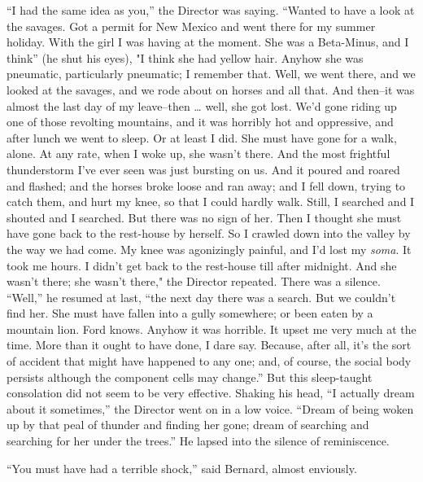 \documentclass[12pt]{report}
\begin{document}
``I had the same idea as you,'' the Director was saying. ``Wanted to
have a look at the savages. Got a permit for New Mexico and went there
for my summer holiday. With the girl I was having at the moment. She was
a Beta-Minus, and I think'' (he shut his eyes), "I think she had yellow
hair. Anyhow she was pneumatic, particularly pneumatic; I remember that.
Well, we went there, and we looked at the savages, and we rode about on
horses and all that. And then--it was almost the last day of my
leave--then \ldots{} well, she got lost. We'd gone riding up one of
those revolting mountains, and it was horribly hot and oppressive, and
after lunch we went to sleep. Or at least I did. She must have gone for
a walk, alone. At any rate, when I woke up, she wasn't there. And the
most frightful thunderstorm I've ever seen was just bursting on us. And
it poured and roared and flashed; and the horses broke loose and ran
away; and I fell down, trying to catch them, and hurt my knee, so that I
could hardly walk. Still, I searched and I shouted and I searched. But
there was no sign of her. Then I thought she must have gone back to the
rest-house by herself. So I crawled down into the valley by the way we
had come. My knee was agonizingly painful, and I'd lost my \emph{soma}.
It took me hours. I didn't get back to the rest-house till after
midnight. And she wasn't there; she wasn't there," the Director
repeated. There was a silence. ``Well,'' he resumed at last, ``the next
day there was a search. But we couldn't find her. She must have fallen
into a gully somewhere; or been eaten by a mountain lion. Ford knows.
Anyhow it was horrible. It upset me very much at the time. More than it
ought to have done, I dare say. Because, after all, it's the sort of
accident that might have happened to any one; and, of course, the social
body persists although the component cells may change.'' But this
sleep-taught consolation did not seem to be very effective. Shaking his
head, ``I actually dream about it sometimes,'' the Director went on in a
low voice. ``Dream of being woken up by that peal of thunder and finding
her gone; dream of searching and searching for her under the trees.'' He
lapsed into the silence of reminiscence.

``You must have had a terrible shock,'' said Bernard, almost enviously.
\end{document}
